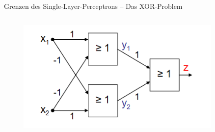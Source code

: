 \documentclass[aspectratio=1610, xcolor=dvipsnames, 9pt]{beamer}
\begin{document}
\begin{frame}{Grenzen des Single-Layer-Perceptrons -- Das XOR-Problem}
\begin{columns}
\begin{column}{0.4\textwidth}
      \begin{figure}
        \centering
                    \includegraphics[width=0.9\textwidth]{images/XOR.png}
        \end{figure}
    \end{column}
  \end{columns}
\end{frame}
\end{document}
